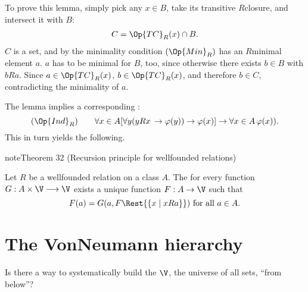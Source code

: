 \documentclass[letterpaper,10pt,english]{jupyterBook}
\begin{document}
\sphinxAtStartPar
To prove this lemma, simply pick any \(x \in B\), take its transitive \(R\)\sphinxhyphen{}closure, and intersect it with \(B\):
\begin{equation*}
\begin{split}
    C = \Op{TC}_R(x) \cap B.
\end{split}
\end{equation*}
\sphinxAtStartPar
\(C\) is a set, and by the minimality condition \((\Op{Min}_R)\) has an \(R\)\sphinxhyphen{}minimal element \(a\). \(a\) has to be minimal for \(B\), too, since otherwise there exists \(b \in B\) with \(b R a\). Since \(a \in \Op{TC}_R(x)\), \(b \in \Op{TC}_R(x)\), and therefore \(b \in C\), contradicting the minimality of \(a\).

\sphinxAtStartPar
The lemma implies a corresponding :
\begin{equation*}
    (\Op{Ind}_R) \qquad  \forall x \in A [ \forall y ( yRx \, \to \varphi(y)) \to \varphi(x)] \to \forall x \in A \, \varphi(x)).
\end{equation*}
\sphinxAtStartPar
This in turn yields the following.
\label{recursion:thm-wf-recursion}
\begin{sphinxadmonition}{note}{Theorem 32 (Recursion principle for well\sphinxhyphen{}founded relations)}



\sphinxAtStartPar
Let \(R\) be a well\sphinxhyphen{}founded relation on a class \(A\). The for every function \(G : A \times \V \longrightarrow  \V\) exists a unique function \(F: A \to \V\) such that
\begin{equation*}
    F(a) = G(a,F \Rest{\{x \mid xRa\}})  \text{ for all } a \in A.
\end{equation*}\end{sphinxadmonition}


\section{The Von\sphinxhyphen{}Neumann hierarchy}
\label{\detokenize{recursion:the-von-neumann-hierarchy}}
\sphinxAtStartPar
Is there a way to systematically build the \(\V\), the universe of all sets, “from below”?
\end{document}
